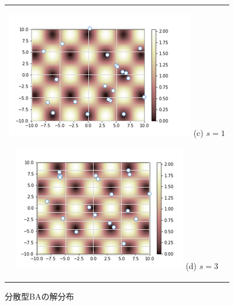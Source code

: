 \documentclass{jarticle}
\begin{document}
\begin{figure}[h]
\begin{center}
\begin{tabular}{c}
\begin{minipage}[t]{0.45\linewidth}
\begin{center}
\includegraphics[keepaspectratio, scale=0.45]{sbat01.bmp} (c) ${s=1}$
\end{center}
\end{minipage}

\begin{minipage}[t]{0.45\linewidth}
\begin{center}
\includegraphics[keepaspectratio, scale=0.45]{sbat03_n20.bmp} (d) ${s=3}$
\end{center}
\end{minipage}\\
\end{tabular}
\caption{分散型BAの解分布}
\label{fig:s*pbestposition}
\end{center}
\end{figure}
\end{document}
